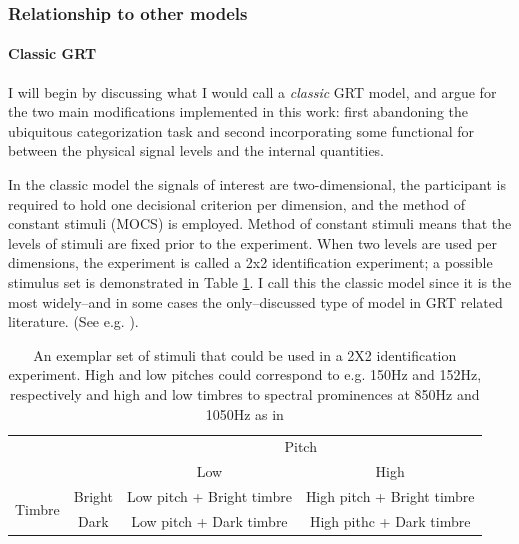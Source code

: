\documentclass{article}\usepackage{knitr}
\begin{document}
\subsubsection{Relationship to other models}

\paragraph{Classic GRT}

I will begin by discussing what I would call a \textit{classic} GRT model, and argue for the two main modifications implemented in this work: first abandoning the ubiquitous categorization task and second incorporating some functional for between the physical signal levels and the internal quantities. 

In the classic model the signals of interest are two-dimensional, the participant is required to hold one decisional criterion per dimension, and the method of constant stimuli (MOCS) is employed. Method of constant stimuli means that the levels of stimuli are fixed prior to the experiment. When two levels are used per dimensions, the experiment is called a 2x2 identification experiment;  a possible stimulus set is demonstrated in Table \ref{table:classicGRT}. I call this the classic model since it is the most widely--and in some cases the only--discussed type of model in GRT related literature. (See e.g. \cite{ashby2015, ashby1986, cohen2003, kadlec1992, silbert2010, silbert2013}). 

\begin{table}[!htb]
 \centering
  \caption{An exemplar set of stimuli that could be used in a 2X2 identification experiment. High and low pitches could correspond to e.g. 150Hz and 152Hz, respectively and high and low timbres to spectral prominences at 850Hz and 1050Hz as in \cite{silbert2009}}
  \vspace{0.5cm}
  \label{table:classicGRT}
   \begin{tabular}{rccc}
    \hline
     &       &         \multicolumn{2}{c}{Pitch} \\
                       \cline{3-4}
             &         & Low             & High   \\
     \hline
    \multirow{2}{*}{Timbre} 
            & Bright & \parbox[t]{5cm}{Low pitch + Bright timbre\\}& \parbox[t]{5cm}{High pitch + Bright timbre\\}\\
            & Dark    & \parbox[t]{5cm}{Low pitch + Dark timbre \\}  & \parbox[t]{5cm}{High pithc + Dark timbre \\ }\\
     \hline
    \end{tabular}
\end{table}
\end{document}
